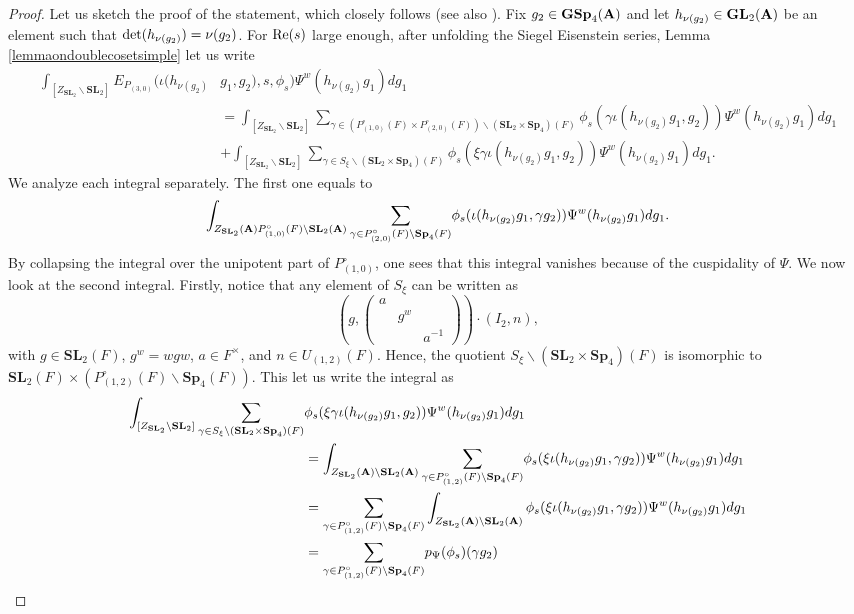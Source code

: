 \documentclass[11pt, reqno]{amsart}
\theoremstyle{plain}
\theoremstyle{definition}
\theoremstyle{remark}
\theoremstyle{plain}
\def\SL{{\mathbf{SL}}}
\def\A{{\bf A}}
\def\GSp{{\mathbf{GSp}}}
\def\Sp{{\mathbf{Sp}}}
\def\GL{\mathbf{GL}}
\begin{document}
\begin{proof} Let us sketch the proof of the statement, which closely follows \cite{GarrettIntegralRepEisenstein} (see also \cite{PitaleSchmidt}). Fix $g_2 \in \GSp_4(\A)$ and let $h_{\nu(g_2)} \in \GL_2(\A)$ be an element such that  ${\rm det}(h_{\nu(g_2)}) = {\nu(g_2)}$. For ${\rm Re}(s)$ large enough, after unfolding the Siegel Eisenstein series, Lemma \ref{lemmaondoublecosetsimple} let us write \begin{align*}
    \int_{[Z_{\SL_2}\backslash \SL_2]} E_{P_{(3,0)}}(\iota( h_{\nu(g_2)} &g_1  , g_2), s,\phi_s) \Psi^w( h_{\nu(g_2)} g_1  ) d g_1 \\ 
    &= \int_{[Z_{\SL_2}\backslash \SL_2]} {\sum_{\gamma \in (P_{(1,0)}^\circ(F) \times P_{(2,0)}^\circ(F))\backslash (\SL_2\times \Sp_4)(F)}} \phi_s(\gamma \iota( h_{\nu(g_2)} g_1  , g_2))\Psi^w( h_{\nu(g_2)} g_1  ) d g_1 \\ &+ \int_{[Z_{\SL_2}\backslash \SL_2]} {\sum_{\gamma \in S_\xi \backslash (\SL_2\times  \Sp_4)(F)}} \phi_s(\xi \gamma \iota( h_{\nu(g_2)} g_1  , g_2))\Psi^w( h_{\nu(g_2)} g_1  ) d g_1.
\end{align*}
We analyze each integral separately. The first one equals to 
\[ \int_{Z_{\SL_2}(\A)P_{(1,0)}^\circ(F) \backslash \SL_2(\A)} {\sum_{\gamma \in P_{(2,0)}^\circ(F)\backslash \Sp_4(F)}} \phi_s(\iota( h_{\nu(g_2)} g_1  , \gamma g_2))\Psi^w( h_{\nu(g_2)} g_1  ) d g_1.  \]
By collapsing the integral over the unipotent part of $P_{(1,0)}^{\circ}$, one sees that this integral vanishes because of the cuspidality of $\Psi$. We now look at the second integral. Firstly, notice that any element of $S_\xi$ can be written as  \begin{equation}\label{Form:Stab} \left(g, \left(\begin{smallmatrix} a &  &  \\ & g^w & \\  & & a^{-1} \end{smallmatrix} \right)\right) \cdot \left( I_2 , n \right), \end{equation}
with $g \in \SL_2(F)$, $g^w = w g w $, $a \in F^\times$, and $n \in U_{(1,2)}(F)$. Hence, the quotient $S_\xi\backslash (\SL_2 \times \Sp_4)(F)$ is isomorphic to $\SL_2(F) \times \left (P_{(1,2)}^\circ (F) \backslash \Sp_4(F) \right)$. This let us write the integral as
\begin{align*}
     \int_{[Z_{\SL_2}\backslash \SL_2]} {\sum_{\gamma \in S_\xi \backslash (\SL_2\times  \Sp_4)(F)}} &\phi_s(\xi \gamma \iota( h_{\nu(g_2)} g_1  , g_2))\Psi^w( h_{\nu(g_2)} g_1  ) d g_1 \\ &= \int_{Z_{\SL_2}(\A)\backslash \SL_2(\A)} {\sum_{\gamma \in P_{(1,2)}^\circ (F) \backslash \Sp_4(F)}} \phi_s(\xi  \iota( h_{\nu(g_2)} g_1  , \gamma g_2))\Psi^w( h_{\nu(g_2)} g_1  ) d g_1 \\ &= {\sum_{\gamma \in P_{(1,2)}^\circ (F) \backslash \Sp_4(F)}} \int_{Z_{\SL_2}(\A)\backslash \SL_2(\A)}  \phi_s(\xi  \iota( h_{\nu(g_2)} g_1  , \gamma g_2))\Psi^w( h_{\nu(g_2)} g_1  ) d g_1 \\ &= {\sum_{\gamma \in P_{(1,2)}^\circ (F) \backslash \Sp_4(F)}} p_\Psi(\phi_s)(\gamma g_2) \\ 

\end{align*}
\end{proof}
\end{document}

